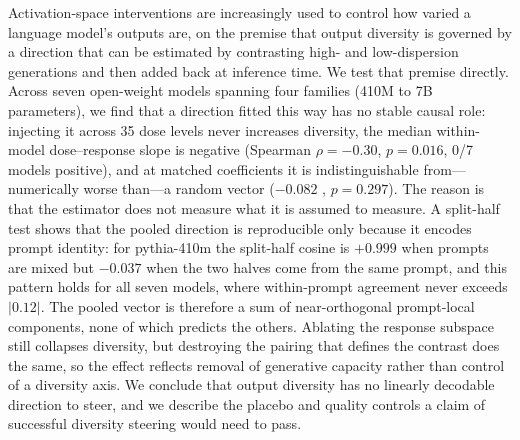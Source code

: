 Activation-space interventions are increasingly used to control how varied a language model's
outputs are, on the premise that output diversity is governed by a direction that can be
estimated by contrasting high- and low-dispersion generations and then added back at inference
time. We test that premise directly. Across seven open-weight models spanning four families
(410M to 7B parameters), we find that a direction fitted this way has no stable causal role:
injecting it across 35 dose levels never increases diversity, the median within-model
dose--response slope is negative (Spearman $\rho = -0.30$, $p = 0.016$, 0/7 models positive),
and at matched coefficients it is indistinguishable from---numerically worse than---a random
vector ($-0.082$ \vendi{}, $p = 0.297$). The reason is that the estimator does not measure what
it is assumed to measure. A split-half test shows that the pooled direction is reproducible only
because it encodes prompt identity: for pythia-410m the split-half cosine is $+0.999$ when
prompts are mixed but $-0.037$ when the two halves come from the same prompt, and this pattern
holds for all seven models, where within-prompt agreement never exceeds $|0.12|$. The pooled
vector is therefore a sum of near-orthogonal prompt-local components, none of which predicts the
others. Ablating the response subspace still collapses diversity, but destroying the pairing that
defines the contrast does the same, so the effect reflects removal of generative capacity rather
than control of a diversity axis. We conclude that output diversity has no linearly decodable
direction to steer, and we describe the placebo and quality controls a claim of successful
diversity steering would need to pass.
